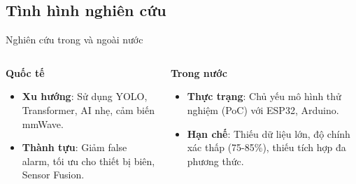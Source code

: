 
\subsection{Tình hình nghiên cứu}
\begin{frame}{Nghiên cứu trong và ngoài nước}
    \begin{columns}[T]
        \begin{column}{0.48\textwidth}
            \textbf{Quốc tế}
            \begin{itemize}
                \item \textbf{Xu hướng}: Sử dụng YOLO, Transformer, AI nhẹ, cảm biến mmWave.
                \item \textbf{Thành tựu}: Giảm false alarm, tối ưu cho thiết bị biên, Sensor Fusion.
            \end{itemize}
        \end{column}
        \begin{column}{0.48\textwidth}
            \textbf{Trong nước}
            \begin{itemize}
                \item \textbf{Thực trạng}: Chủ yếu mô hình thử nghiệm (PoC) với ESP32, Arduino.
                \item \textbf{Hạn chế}: Thiếu dữ liệu lớn, độ chính xác thấp (75-85\%), thiếu tích hợp đa phương thức.
            \end{itemize}
        \end{column}
    \end{columns}
\end{frame}

